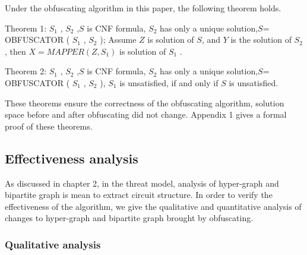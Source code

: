 \documentclass[runningheads,a4paper]{llncs}
\begin{document}
Under the obfuscating algorithm in this paper, the following theorem holds.


Theorem 1: $S_1$ , $S_2$ ,$S$ is CNF formula, $S_2$ has only a unique solution,$S$= OBFUSCATOR ( $S_1$ , $S_2$ ); 
 Assume $Z$ is solution of $S$, and $Y$ is the solution of $S_2$ , 
 then $X = MAPPER (Z, S_1)$ is solution of $S_1$ .

Theorem 2: $S_1$ , $S_2$ ,$S$ is CNF formula, $S_2$ has only a unique solution,$S$= OBFUSCATOR ( $S_1$ , $S_2$ ),
$S_1$  is unsatisfied, if and only if $S$ is unsatisfied.

These theorems ensure the correctness of the obfuscating algorithm, solution space before and after obfuscating did not change. Appendix 1 gives a formal proof of these theorems.
\subsection{Effectiveness analysis}

As discussed in chapter 2, in the threat model, analysis of hyper-graph and bipartite graph is mean to extract circuit structure. 
In order to verify the effectiveness of the algorithm, we give the qualitative and quantitative analysis of changes to hyper-graph and bipartite graph brought by obfuscating.
\subsubsection{Qualitative analysis}
\end{document}
